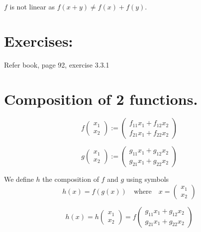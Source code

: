 \documentclass[a4paper, 12pt]{article}
\begin{document}
$f$ is not linear as $f(x+y) \neq f(x) + f(y)$.

\section*{Exercises:}
Refer book, page 92, exercise 3.3.1

\section*{Composition of 2 functions.}
\[
f\begin{pmatrix}
x_1 \\
x_2
\end{pmatrix}
:=
\begin{pmatrix}
f_{11}x_1 + f_{12}x_2 \\
f_{21}x_1 + f_{22}x_2
\end{pmatrix}
\]

\[
g\begin{pmatrix}
x_1 \\
x_2
\end{pmatrix}
:=
\begin{pmatrix}
g_{11}x_1 + g_{12}x_2 \\
g_{21}x_1 + g_{22}x_2
\end{pmatrix}
\]

We define $h$ the composition of $f$ and $g$ using symbols
\[
h(x) = f(g(x)) \quad \text{where} \quad x = \begin{pmatrix}
x_1 \\
x_2
\end{pmatrix}
\]

\[
h(x) = h\begin{pmatrix}
x_1 \\
x_2
\end{pmatrix}
=
f\begin{pmatrix}
g_{11}x_1 + g_{12}x_2 \\
g_{21}x_1 + g_{22}x_2
\end{pmatrix}
\]
\end{document}

